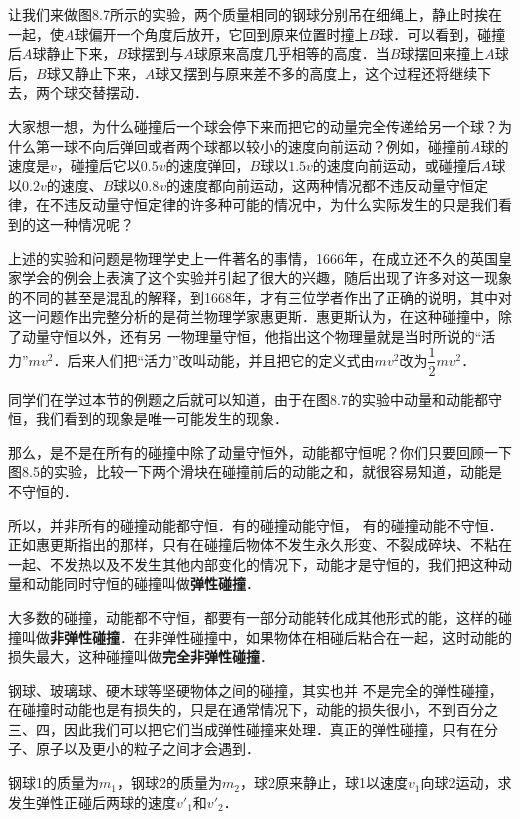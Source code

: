 让我们来做图8.7所示的实验，两个质量相同的钢球分别吊在细绳上，静止时挨在一起，使$A$球偏开一个角度后放开，它回到原来位置时撞上$B$球．可以看到，碰撞后$A$球静止下来，$B$球摆到与$A$球原来高度几乎相等的高度．当$B$球摆回来撞上$A$球后，$B$球又静止下来，$A$球又摆到与原来差不多的高度上，这个过程还将继续下去，两个球交替摆动．

大家想一想，为什么碰撞后一个球会停下来而把它的动量完全传递给另一个球？为什么第一球不向后弹回或者两个球都以较小的速度向前运动？例如，碰撞前$A$球的速度是$v$，碰撞后它以$0.5v$的速度弹回，$B$球以$1.5v$的速度向前运动，或碰撞后$A$球以$0.2v$的速度、$B$球以$0.8v$的速度都向前运动，这两种情况都不违反动量守恒定律，在不违反动量守恒定律的许多种可能的情况中，为什么实际发生的只是我们看到的这一种情况呢？

上述的实验和问题是物理学史上一件著名的事情，1666年，在成立还不久的英国皇家学会的例会上表演了这个实验并引起了很大的兴趣，随后出现了许多对这一现象的不同的甚至是混乱的解释，到1668年，才有三位学者作出了正确的说明，其中对这一问题作出完整分析的是荷兰物理学家惠更斯．惠更斯认为，在这种碰撞中，除了动量守恒以外，还有另
一物理量守恒，他指出这个物理量就是当时所说的“活力”$mv^2$．后来人们把“活力”改叫动能，并且把它的定义式由$mv^2$改为$\dfrac{1}{2}mv^2$．

同学们在学过本节的例题之后就可以知道，由于在图8.7的实验中动量和动能都守恒，我们看到的现象是唯一可能发生的现象．

那么，是不是在所有的碰撞中除了动量守恒外，动能都守恒呢？你们只要回顾一下图8.5的实验，比较一下两个滑块在碰撞前后的动能之和，就很容易知道，动能是不守恒的．

所以，并非所有的碰撞动能都守恒．有的碰撞动能守恒，
有的碰撞动能不守恒．正如惠更斯指出的那样，只有在碰撞后物体不发生永久形变、不裂成碎块、不粘在一起、不发热以及不发生其他内部变化的情况下，动能才是守恒的，我们把这种动量和动能同时守恒的碰撞叫做\textbf{弹性碰撞}．

大多数的碰撞，动能都不守恒，都要有一部分动能转化成其他形式的能，这样的碰撞叫做\textbf{非弹性碰撞}．在非弹性碰撞中，如果物体在相碰后粘合在一起，这时动能的损失最大，这种碰撞叫做\textbf{完全非弹性碰撞}．

钢球、玻璃球、硬木球等坚硬物体之间的碰撞，其实也并
不是完全的弹性碰撞，在碰撞时动能也是有损失的，只是在通常情况下，动能的损失很小，不到百分之三、四，因此我们可以把它们当成弹性碰撞来处理．真正的弹性碰撞，只有在分子、原子以及更小的粒子之间才会遇到．


\begin{example}
    钢球1的质量为$m_1$，钢球2的质量为$m_2$，球2原来静止，球1以速度$v_1$向球2运动，求发生弹性正碰后两球的速度$v'_1$和$v'_2$．
\end{example}


